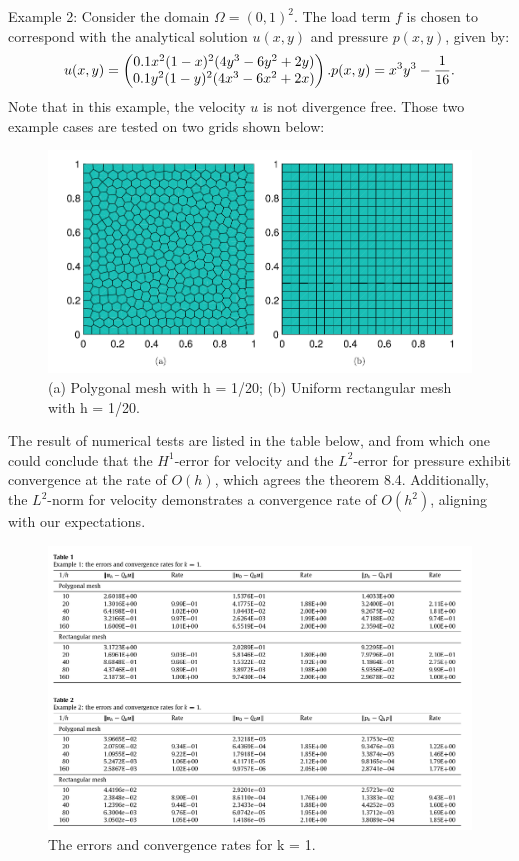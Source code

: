 \documentclass[12pt]{article} %
\begin{document}
Example 2:
Consider the domain \( \Omega = (0, 1)^2 \). The load term \( f \) is chosen to correspond with the analytical solution \( u(x, y) \) and pressure \( p(x, y) \), given by:
\begin{equation}
    u(x, y) = 
    \begin{pmatrix}
        0.1 x^2 (1 - x)^2 (4y^3 - 6y^2 + 2y) \\
        0.1 y^2 (1 - y)^2 (4x^3 - 6x^2 + 2x)
    \end{pmatrix}.\\
    p(x, y) = x^3 y^3 - \frac{1}{16}.
\end{equation}
Note that in this example, the velocity \( u \) is not divergence free.
Those two example cases are tested on two grids shown below:
\begin{figure}[ht]
    \centering
    \includegraphics[width=1\textwidth]{NS_grid.png}
    \caption{(a) Polygonal mesh with h = 1/20; (b) Uniform rectangular mesh with h = 1/20.\cite{Hu2019}}
\end{figure}
\clearpage
The result of numerical tests are listed in the table below, and from which one could conclude that the \(H^1\)-error for velocity and the \(L^2\)-error for pressure exhibit convergence at the rate of \(O(h)\), which agrees the theorem 8.4. Additionally, the \(L^2\)-norm for velocity demonstrates a convergence rate of \(O(h^2)\), aligning with our expectations.
\begin{figure}[ht]
    \centering
    \includegraphics[width=1\textwidth]{NS_result.png}
    \caption{The errors and convergence rates for k = 1.\cite{Hu2019}}
\end{figure}
\clearpage
\end{document}
